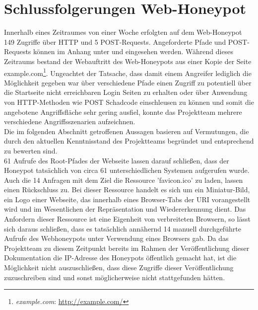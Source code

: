 \section{Schlussfolgerungen Web-Honeypot}
\label{sec:Schlussfolgerungen Web-Honeypot}

Innerhalb eines Zeitraumes von einer Woche erfolgten auf dem Web-Honeypot 149 Zugriffe über HTTP und 5 POST-Requests. Angeforderte Pfade und POST-Requests können im Anhang unter  und  eingesehen werden. Während dieses Zeitraums bestand der Webauftritt des Web-Honeypots aus einer Kopie der Seite example.com\footnote{ \textit{example.com}: \url{http://example.com/}}. Ungeachtet der Tatsache, dass damit einem Angreifer lediglich die Möglichkeit gegeben war über verschiedene Pfade einen Zugriff zu potentiell über die Startseite nicht erreichbaren Login Seiten zu erhalten oder über Anwendung von HTTP-Methoden wie POST Schadcode einschleusen zu können und somit die angebotene Angriffsfläche sehr gering ausfiel, konnte das Projektteam mehrere verschiedene Angriffsszenarien aufzeichnen.\\

Die im folgenden Abschnitt getroffenen Aussagen basieren auf Vermutungen, die durch den aktuellen Kenntnisstand des Projektteams begründet und entsprechend zu bewerten sind.\\

61 Aufrufe des Root-Pfades der Webseite lassen darauf schließen, dass der Honeypot tatsächlich von circa 61 unterschiedlichen Systemen aufgerufen wurde. Auch die 14 Anfragen mit dem Ziel die Ressource 'favicon.ico' zu laden, lassen einen Rückschluss zu.  Bei dieser Ressource handelt es sich um ein Miniatur-Bild, ein Logo einer Webseite, das innerhalb eines Browser-Tabs der URI vorangestellt wird und im Wesentlichen der Repräsentation und Wiedererkennung dient. Das Anfordern dieser Ressource ist eine Eigenheit von verbreiteten Browsern, so lässt sich daraus schließen, dass es tatsächlich annähernd 14 manuell durchgeführte Aufrufe des Webhoneypots unter Verwendung eines Browsers gab. Da das Projektteam zu diesem Zeitpunkt bereits im Rahmen der Veröffentlichung dieser Dokumentation die IP-Adresse des Honeypots öffentlich gemacht hat, ist die Möglichkeit nicht auszuschließen, dass diese Zugriffe dieser Veröffentlichung zuzuschreiben sind und sonst möglicherweise nicht stattgefunden hätten.\\ 


